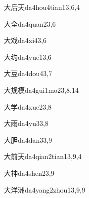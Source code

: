\begin{verbete}{大后天}{da4hou4tian1}{3,6,4}
\end{verbete}

\begin{verbete}{大全}{da4quan2}{3,6}
\end{verbete}

\begin{verbete}{大戏}{da4xi4}{3,6}
\end{verbete}

\begin{verbete}{大约}{da4yue1}{3,6}
\end{verbete}

\begin{verbete}{大豆}{da4dou4}{3,7}
\end{verbete}

\begin{verbete}{大规模}{da4gui1mo2}{3,8,14}
\end{verbete}

\begin{verbete}{大学}{da4xue2}{3,8}
\end{verbete}

\begin{verbete}{大雨}{da4yu3}{3,8}
\end{verbete}

\begin{verbete}{大胆}{da4dan3}{3,9}
\end{verbete}

\begin{verbete}{大前天}{da4qian2tian1}{3,9,4}
\end{verbete}

\begin{verbete}{大神}{da4shen2}{3,9}
\end{verbete}

\begin{verbete}{大洋洲}{da4yang2zhou1}{3,9,9}
\end{verbete}

